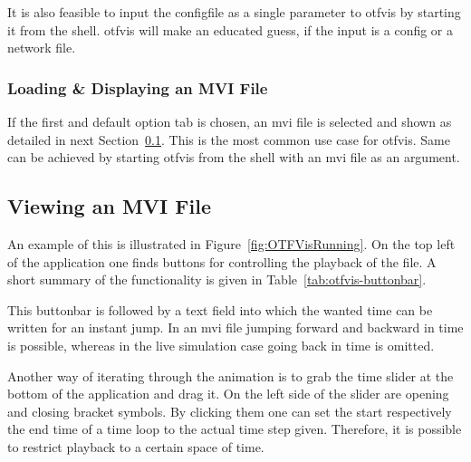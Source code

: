 It is also feasible to input the \gls{configfile} as a single parameter to \gls{otfvis} by starting it from the shell. \gls{otfvis} will make an educated guess, if the input is a config or a network file.

\subsubsection{Loading \& Displaying an MVI File}
If the first and default option tab is chosen, an \gls{mvi} file is selected and shown as detailed in next Section~\ref{sec:otfvis-viewing-an-mvi-file}. This is the most common use case for \gls{otfvis}. Same can be achieved by starting \gls{otfvis} from the shell with an \gls{mvi} file as an argument.

\subsection{Viewing an MVI File}
\label{sec:otfvis-viewing-an-mvi-file}
An example of this is illustrated in Figure~\ref{fig:OTFVisRunning}. On the top left of the application one finds buttons for controlling the playback of the file. A short summary of the functionality is given in Table~\ref{tab:otfvis-buttonbar}.

This buttonbar is followed by a text field into which the wanted time can be written for an instant jump. In an \gls{mvi} file jumping forward and backward in time is possible, whereas in the live simulation case going back in time is omitted.

Another way of iterating through the animation is to grab the time slider at the bottom of the application and drag it. 
On the left side of the slider are opening and closing bracket symbols. 
By clicking them one can set the start respectively the end time of a time loop to the actual time step given. 
Therefore, it is possible to restrict playback to a certain space of time.

